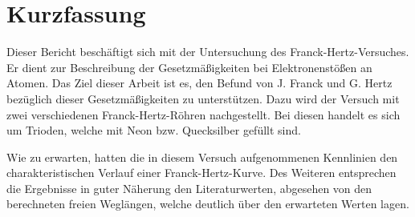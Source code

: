 \section{Kurzfassung}

Dieser Bericht beschäftigt sich mit der Untersuchung des Franck-Hertz-Versuches.
Er dient zur Beschreibung der Gesetzmäßigkeiten bei Elektronenstößen an Atomen.
Das Ziel dieser Arbeit ist es, den Befund von J. Franck und G. Hertz bezüglich dieser Gesetzmäßigkeiten zu unterstützen.
Dazu wird der Versuch mit zwei verschiedenen Franck-Hertz-Röhren nachgestellt.
Bei diesen handelt es sich um Trioden, welche mit Neon bzw. Quecksilber gefüllt sind.

Wie zu erwarten, hatten die in diesem Versuch aufgenommenen Kennlinien den charakteristischen Verlauf einer Franck-Hertz-Kurve.
Des Weiteren entsprechen die Ergebnisse in guter Näherung den Literaturwerten, abgesehen von den berechneten freien Weglängen, welche deutlich über den erwarteten Werten lagen.